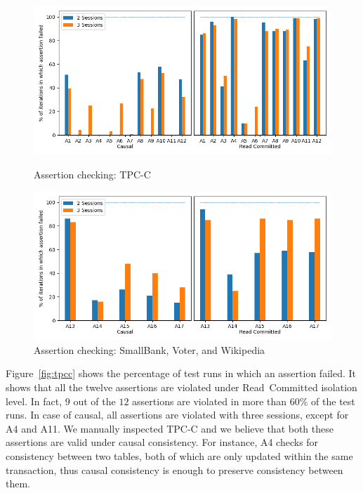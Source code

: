 \begin{figure}[!ht]
    \centering
    \begin{minipage}{\textwidth}
        \centering
    	\includegraphics[scale=0.4]{Sources/sql/plots/random_strongest_tpcc.png}
	    \caption{Assertion checking: {TPC-C}}
        \label{fig:tpcc}
	\end{minipage}
	
    \begin{minipage}{\textwidth}
        \centering
		\includegraphics[scale=0.4]{Sources/sql/plots/random_strongest_all.png}
	    \caption{Assertion checking: SmallBank, Voter, and Wikipedia}
    \label{fig:rest}
    \end{minipage}
\end{figure}

Figure~\ref{fig:tpcc} %
shows the percentage of test runs in which an assertion failed. 
It shows that all the twelve assertions are violated under
Read~Committed isolation level. In fact, $9$ out of the $12$ 
assertions are violated in more than 60\% of the test runs.
In case of causal, %
all assertions are violated
with three sessions, except for A4 and A11. We manually inspected TPC-C and
we believe that both these assertions are valid under causal consistency. 
For instance, A4 checks for consistency between two tables, both of which are
only updated within the same transaction, thus causal consistency is enough to
preserve consistency between them.

